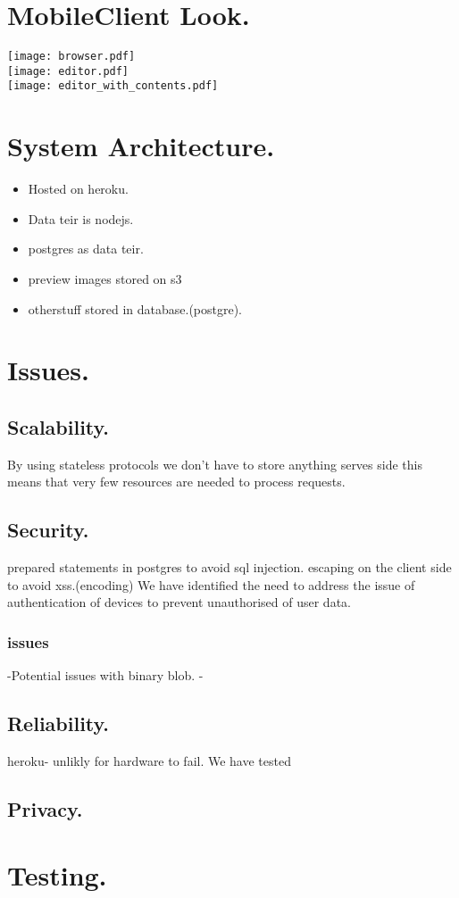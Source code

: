 \documentclass[10pt,a4paper]{article}
\begin{document}
\section*{MobileClient Look.}
\texttt{[image: browser.pdf]}
\hfill\\
\texttt{[image: editor.pdf]}
\hfill\\
\texttt{[image: editor\_with\_contents.pdf]}

\newpage
\section*{System Architecture.}
\begin{itemize}
\item Hosted on heroku.
\item Data teir is nodejs.
\item postgres as data teir.
\item preview images stored on s3
\item otherstuff stored in database.(postgre).
\end{itemize}
\newpage
\section*{Issues.}

\subsection*{Scalability.}
	By using stateless protocols we don't have to store anything serves side this means that very few resources are 		         	needed to process requests.
\subsection*{Security.}
	prepared statements in postgres to avoid sql injection.
	escaping on the client side to avoid xss.(encoding)
	We have identified the need to address the issue of authentication of devices to prevent unauthorised       	   of user data.
\subsubsection*{issues}
-Potential issues with binary blob.
-	
\subsection*{Reliability.}
	heroku- unlikly for hardware to fail.
	We have tested 
\subsection*{Privacy.}
\newpage
\section*{Testing.}
\end{document}
